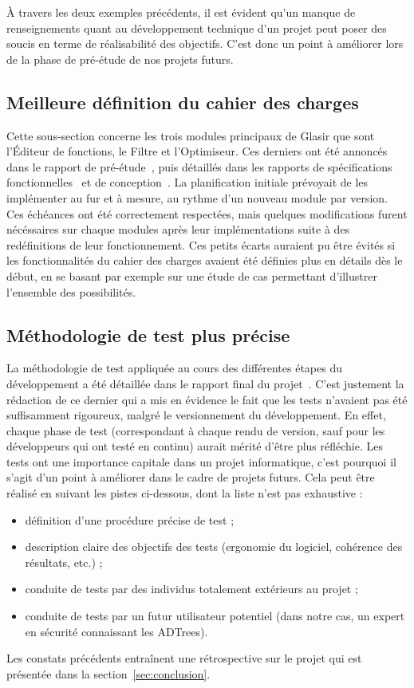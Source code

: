 À travers les deux exemples précédents, il est évident qu'un manque de renseignements quant au développement technique d'un projet peut poser des soucis en terme de réalisabilité des objectifs. C'est donc un point à améliorer lors de la phase de pré-étude de nos projets futurs.

\subsection{Meilleure définition du cahier des charges}
\label{ssec:cahier-charges}

Cette sous-section concerne les trois modules principaux de Glasir que sont l'Éditeur de fonctions, le Filtre et l'Optimiseur. Ces derniers ont été annoncés dans le rapport de pré-étude~\cite{pre_etude}, puis détaillés dans les rapports de spécifications fonctionnelles~\cite{spec_fonc} et de conception~\cite{conception}. La planification initiale prévoyait de les implémenter au fur et à mesure, au rythme d'un nouveau module par version. Ces échéances ont été correctement respectées, mais quelques modifications furent nécéssaires sur chaque modules après leur implémentations suite à des redéfinitions de leur fonctionnement. Ces petits écarts auraient pu être évités si les fonctionnalités du cahier des charges avaient été définies plus en détails dès le début, en se basant par exemple sur une étude de cas permettant d'illustrer l'ensemble des possibilités.

\subsection{Méthodologie de test plus précise}
\label{ssec:methodoTest}

La méthodologie de test appliquée au cours des différentes étapes du développement a été détaillée dans le rapport final du projet~\cite{rapportFinal}. C'est justement la rédaction de ce dernier qui a mis en évidence le fait que les tests n'avaient pas été suffisamment rigoureux, malgré le versionnement du développement. En effet, chaque phase de test (correspondant à chaque rendu de version, sauf pour les développeurs qui ont testé en continu) aurait mérité d'être plus réfléchie. Les tests ont une importance capitale dans un projet informatique, c'est pourquoi il s'agit d'un point à améliorer dans le cadre de projets futurs. Cela peut être réalisé en suivant les pistes ci-dessous, dont la liste n'est pas exhaustive : 

\begin{itemize}
\item définition d'une procédure précise de test ;
\item description claire des objectifs des tests (ergonomie du logiciel, cohérence des résultats, etc.) ;
\item conduite de tests par des individus totalement extérieurs au projet ;
\item conduite de tests par un futur utilisateur potentiel (dans notre cas, un expert en sécurité connaissant les ADTrees).
\end{itemize}

Les constats précédents entraînent une rétrospective sur le projet qui est présentée dans la {\sc section}~\ref{sec:conclusion}.
